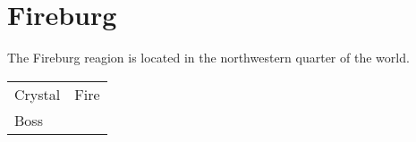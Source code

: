 \section{Fireburg}

The Fireburg reagion is located in the northwestern quarter of the world.

\noindent\begin{tabularx}{\textwidth}[l]{lX}
	Crystal & Fire \\
	Boss & \nameref{monster:dualhead_hydra}
\end{tabularx}














